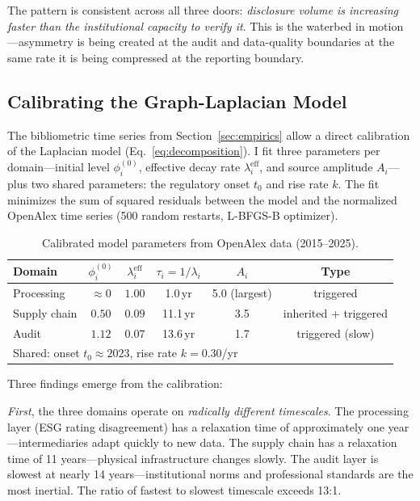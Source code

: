 \documentclass[12pt,a4paper]{article}
\begin{document}
The pattern is consistent across all three doors: \textit{disclosure volume is increasing faster than the institutional capacity to verify it}. This is the waterbed in motion---asymmetry is being created at the audit and data-quality boundaries at the same rate it is being compressed at the reporting boundary.


\subsection{Calibrating the Graph-Laplacian Model}
\label{sec:calibration}

The bibliometric time series from Section~\ref{sec:empirics} allow a direct calibration of the Laplacian model (Eq.~\ref{eq:decomposition}). I fit three parameters per domain---initial level $\phi_i^{(0)}$, effective decay rate $\lambda_i^{\text{eff}}$, and source amplitude $A_i$---plus two shared parameters: the regulatory onset $t_0$ and rise rate $k$. The fit minimizes the sum of squared residuals between the model and the normalized OpenAlex time series (500 random restarts, L-BFGS-B optimizer).

\begin{table}[H]
\centering
\small
\caption{Calibrated model parameters from OpenAlex data (2015--2025).}
\label{tab:calibration}
\begin{tabular}{lccccc}
\toprule
Domain & $\phi_i^{(0)}$ & $\lambda_i^{\text{eff}}$ & $\tau_i = 1/\lambda_i$ & $A_i$ & Type \\
\midrule
Processing  & $\approx 0$   & $1.00$  & 1.0\,yr   & 5.0 (largest)  & triggered \\
Supply chain & $0.50$         & $0.09$  & 11.1\,yr  & 3.5            & inherited + triggered \\
Audit       & $1.12$         & $0.07$  & 13.6\,yr  & 1.7            & triggered (slow) \\
\midrule
\multicolumn{6}{l}{Shared: onset $t_0 \approx 2023$, rise rate $k = 0.30$/yr} \\
\bottomrule
\end{tabular}
\end{table}

Three findings emerge from the calibration:

\textit{First}, the three domains operate on \textit{radically different timescales}. The processing layer (ESG rating disagreement) has a relaxation time of approximately one year---intermediaries adapt quickly to new data. The supply chain has a relaxation time of 11 years---physical infrastructure changes slowly. The audit layer is slowest at nearly 14 years---institutional norms and professional standards are the most inertial. The ratio of fastest to slowest timescale exceeds 13:1.
\end{document}
